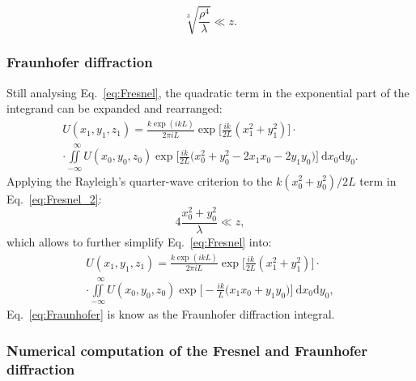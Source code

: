 \begin{refsection}
\begin{equation}\label{eq:accuracy_Fresnel}
    \sqrt[3]{\frac{\rho^4}{\lambda}}\ll z.
\end{equation}

\subsubsection*{Fraunhofer diffraction}

Still analysing Eq.~\ref{eq:Fresnel}, the quadratic term in the exponential part of the integrand can be expanded and rearranged: 
\begin{multline}\label{eq:Fresnel_2}
    U(x_1,y_1,z_1)=\frac{k\exp{(ikL)}}{2\pi i L}\exp{\Bigg[ \frac{ik}{2L}(x_1^2+y_1^2)\Bigg]}\cdot\\
    \cdot\iint\limits_{-\infty}^{\hspace{8pt}\infty}{U(x_0,y_0,z_0)\exp{\Bigg[\frac{ik}{2L}\big(x_0^2+y_0^2-2x_1x_0-2y_1y_0)\Bigg]}~\mathrm{d}x_0\mathrm{d}y_0}.
\end{multline}
Applying the Rayleigh's quarter-wave criterion to the $k(x_0^2+y_0^2)/2L$ term in Eq.~\ref{eq:Fresnel_2}:
\begin{equation}\label{eq:accuracy_Fraunhofer}
    4\frac{x_0^2 +y_0^2}{\lambda}\ll z,
\end{equation}
which allows to further simplify Eq.~\ref{eq:Fresnel} into:
\begin{multline}\label{eq:Fraunhofer}
    U(x_1,y_1,z_1)=\frac{k\exp{(ikL)}}{2\pi i L}\exp{\Bigg[ \frac{ik}{2L}(x_1^2+y_1^2)\Bigg]}\cdot\\
    \cdot\iint\limits_{-\infty}^{\hspace{8pt}\infty}{U(x_0,y_0,z_0)\exp{\Bigg[-\frac{ik}{L}\big(x_1x_0+y_1y_0)\Bigg]}~\mathrm{d}x_0\mathrm{d}y_0},
\end{multline}
Eq.~\ref{eq:Fraunhofer} is know as the Fraunhofer diffraction integral.

\subsubsection*{Numerical computation of the Fresnel and Fraunhofer diffraction}


\end{refsection}

